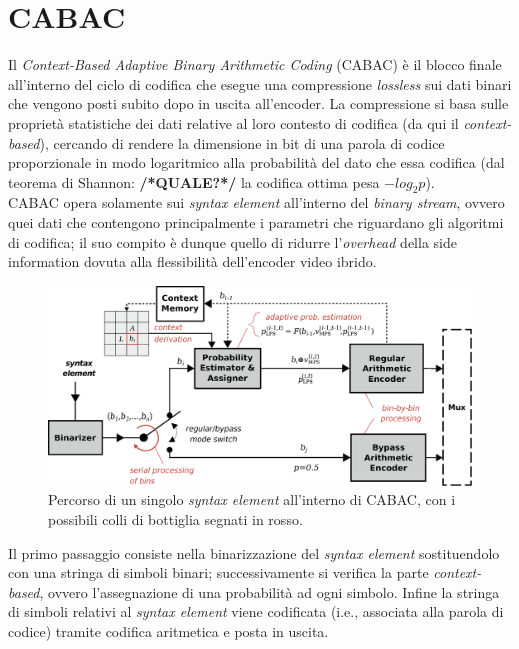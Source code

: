 \section{CABAC}
Il \emph{Context-Based Adaptive Binary Arithmetic Coding} (CABAC) è il blocco 
finale all'interno del ciclo di codifica che esegue una compressione 
\emph{lossless} sui dati binari che vengono posti subito dopo in uscita 
all'encoder. La compressione si basa sulle proprietà statistiche dei dati 
relative al loro contesto di codifica (da qui il \emph{context-based}), cercando
di rendere la dimensione in bit di una parola di codice proporzionale in modo 
logaritmico alla probabilità del dato che essa codifica (dal teorema di Shannon:
\textbf{/*QUALE?*/} la codifica ottima pesa $-log_2p$). \\
CABAC opera solamente sui \emph{syntax element} all'interno del \emph{binary 
stream}, ovvero quei dati che contengono principalmente i parametri che 
riguardano gli algoritmi di codifica; il suo compito è dunque quello di ridurre
l'\emph{overhead} della side information dovuta alla flessibilità dell'encoder 
video ibrido. \\

\begin{figure}[H]
  \centering
  \captionsetup{justification=raggedright}
  \includegraphics[scale=0.35]{Figures/Cabac_overview}
  \caption[Percorso di un \emph{syntax element} dentro CABAC]
	  {Percorso di un singolo \emph{syntax element} all'interno di CABAC,
	   con i possibili colli di bottiglia segnati in rosso.}
\end{figure}

Il primo passaggio consiste nella binarizzazione del \emph{syntax element} 
sostituendolo con una stringa di simboli binari; successivamente si verifica 
la parte \emph{context-based}, ovvero l'assegnazione di una probabilità ad ogni 
simbolo. Infine la stringa di simboli relativi al \emph{syntax element} viene 
codificata (i.e., associata alla parola di codice) tramite codifica aritmetica e
posta in uscita.

